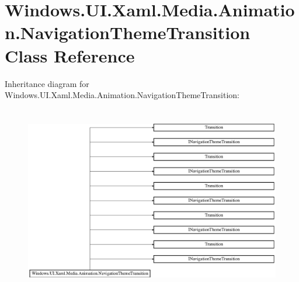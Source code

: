 \hypertarget{class_windows_1_1_u_i_1_1_xaml_1_1_media_1_1_animation_1_1_navigation_theme_transition}{}\section{Windows.\+U\+I.\+Xaml.\+Media.\+Animation.\+Navigation\+Theme\+Transition Class Reference}
\label{class_windows_1_1_u_i_1_1_xaml_1_1_media_1_1_animation_1_1_navigation_theme_transition}
Inheritance diagram for Windows.\+U\+I.\+Xaml.\+Media.\+Animation.\+Navigation\+Theme\+Transition\+:\begin{figure}[H]
\begin{center}
\leavevmode
\includegraphics[height=8.301887cm]{class_windows_1_1_u_i_1_1_xaml_1_1_media_1_1_animation_1_1_navigation_theme_transition}
\end{center}
\end{figure}
